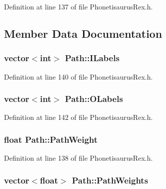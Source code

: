 Definition at line 137 of file Phonetisaurus\+Rex.\+h.



\subsection{Member Data Documentation}
\subsubsection[{I\+Labels}]{\setlength{\rightskip}{0pt plus 5cm}vector$<$int$>$ Path\+::\+I\+Labels}\hypertarget{struct_path_a0c699fd6389ebbaa64a065a396853908}{}\label{struct_path_a0c699fd6389ebbaa64a065a396853908}


Definition at line 140 of file Phonetisaurus\+Rex.\+h.

\subsubsection[{O\+Labels}]{\setlength{\rightskip}{0pt plus 5cm}vector$<$int$>$ Path\+::\+O\+Labels}\hypertarget{struct_path_a46987d60ba6d036132cd6560a078a156}{}\label{struct_path_a46987d60ba6d036132cd6560a078a156}


Definition at line 142 of file Phonetisaurus\+Rex.\+h.

\subsubsection[{Path\+Weight}]{\setlength{\rightskip}{0pt plus 5cm}float Path\+::\+Path\+Weight}\hypertarget{struct_path_a570779e14b8c3c7ec6a21bca22a0c399}{}\label{struct_path_a570779e14b8c3c7ec6a21bca22a0c399}


Definition at line 138 of file Phonetisaurus\+Rex.\+h.

\subsubsection[{Path\+Weights}]{\setlength{\rightskip}{0pt plus 5cm}vector$<$float$>$ Path\+::\+Path\+Weights}\hypertarget{struct_path_acbb6c4076c6c2e5cdd13e9e0e2e9cc30}{}\label{struct_path_acbb6c4076c6c2e5cdd13e9e0e2e9cc30}


